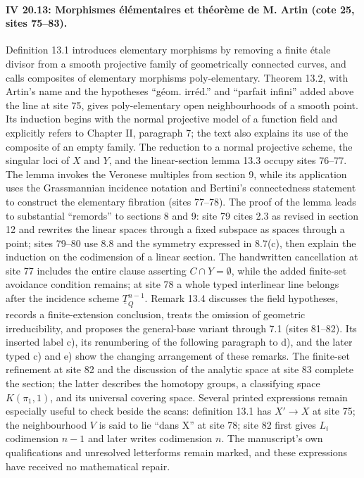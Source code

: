 \paragraph{IV 20.13: Morphismes élémentaires et théorème de M. Artin (cote 25, sites 75--83).}
Definition 13.1 introduces elementary morphisms by removing a finite étale divisor from a smooth projective family of geometrically connected curves, and calls composites of elementary morphisms poly-elementary. Theorem 13.2, with Artin's name and the hypotheses ``géom. irréd.'' and ``parfait infini'' added above the line at site 75, gives poly-elementary open neighbourhoods of a smooth point. Its induction begins with the normal projective model of a function field and explicitly refers to Chapter II, paragraph 7; the text also explains its use of the composite of an empty family. The reduction to a normal projective scheme, the singular loci of $X$ and $Y$, and the linear-section lemma 13.3 occupy sites 76--77. The lemma invokes the Veronese multiples from section 9, while its application uses the Grassmannian incidence notation and Bertini's connectedness statement to construct the elementary fibration (sites 77--78). The proof of the lemma leads to substantial ``remords'' to sections 8 and 9: site 79 cites 2.3 as revised in section 12 and rewrites the linear spaces through a fixed subspace as spaces through a point; sites 79--80 use 8.8 and the symmetry expressed in 8.7(c), then explain the induction on the codimension of a linear section. The handwritten cancellation at site 77 includes the entire clause asserting $C\cap Y=\emptyset$, while the added finite-set avoidance condition remains; at site 78 a whole typed interlinear line belongs after the incidence scheme $\underline{T}^{n-1}_Q$. Remark 13.4 discusses the field hypotheses, records a finite-extension conclusion, treats the omission of geometric irreducibility, and proposes the general-base variant through 7.1 (sites 81--82). Its inserted label c), its renumbering of the following paragraph to d), and the later typed c) and e) show the changing arrangement of these remarks. The finite-set refinement at site 82 and the discussion of the analytic space at site 83 complete the section; the latter describes the homotopy groups, a classifying space $K(\pi_1,1)$, and its universal covering space. Several printed expressions remain especially useful to check beside the scans: definition 13.1 has $X'\to X$ at site 75; the neighbourhood $V$ is said to lie ``dans X'' at site 78; site 82 first gives $L_i$ codimension $n-1$ and later writes codimension $n$. The manuscript's own qualifications and unresolved letterforms remain marked, and these expressions have received no mathematical repair.
